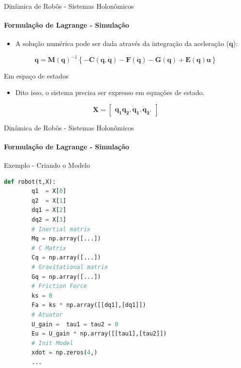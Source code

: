 \documentclass{beamer}
\begin{document}
\begin{frame}{Dinâmica de Robôs - Sistemas Holonômicos}
    \framesubtitle{Formulação de Lagrange - Simulação}
    \begin{itemize}
        \item A solução numérica pode ser dada através da integração da aceleração ($\mathbf{\ddot{q}}$):
    \end{itemize}
    \begin{equation}
        \mathbf{\ddot{q}}=\mathbf{M(q)}^{-1}\left\{\mathbf{-C(q, \dot{q})-F(\dot{q})-G(q) + E(q)u}\right\}
    \end{equation}

    \begin{block}{Em espaço de estados}
        \begin{itemize}
            \item Dito isso, o sistema precisa ser expresso em equações de estado.
        \end{itemize}


        \begin{equation*}
            \mathbf{X} = 
            \begin{bmatrix}
                \mathbf{q_1 q_2, \dot{q}_1, \dot{q}_2}.  
            \end{bmatrix}
        \end{equation*}
    \end{block}
\end{frame}


\begin{frame}[fragile]{Dinâmica de Robôs - Sistemas Holonômicos}
    \framesubtitle{Formulação de Lagrange - Simulação}
    Exemplo - Criando o Modelo
	\begin{lstlisting}[language=Python]
    def robot(t,X):
        q1  = X[0]
        q2  = X[1]
        dq1 = X[2] 
        dq2 = X[3]
        # Inertial matrix
        Mq = np.array([...]) 
        # C Matrix
        Cq = np.array([...])
        # Gravitational matrix 
        Gq = np.array([...])
        # Friction Force
        ks = 0
        Fa = ks * np.array([[dq1],[dq1]])
        # Atuator
        U_gain =  tau1 = tau2 = 0
        Eu = U_gain * np.array([[tau1],[tau2]])
        # Init Model
        xdot = np.zeros(4,)
        ...
	\end{lstlisting}
\end{frame}
\end{document}
